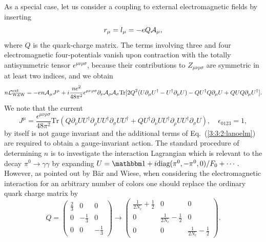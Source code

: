 \documentclass[twoside,12pt]{article}
\begin{document}
   As a special case, let us consider a coupling to external electromagnetic
fields by inserting
\begin{displaymath}
r_\mu=l_\mu=-e Q {\cal A}_\mu,
\end{displaymath}
where $Q$ is the quark-charge matrix.
   The terms involving three and four electromagnetic four-potentials
vanish upon contraction with the totally antisymmetric tensor
$\epsilon^{\mu\nu\rho\sigma}$, because their contributions to
$Z_{\mu\nu\rho\sigma}$ are symmetric in at least two indices, and
we obtain
\begin{equation}
\label{3:3:2:lanoelm}
n{\cal L}^{\rm ext}_{\rm WZW}=-e n {\cal A}_\mu J^\mu
+i \frac{n e^2 }{48\pi^2}\epsilon^{\mu\nu\rho\sigma}
\partial_\nu {\cal A}_\rho{\cal A}_\sigma
\mbox{Tr}[2Q^2(U\partial_\mu U^\dagger - U^\dagger \partial_\mu U)
- Q U^\dagger Q \partial_\mu U
+Q U Q \partial_\mu U^\dagger].
\end{equation}
   We note that the current
\begin{equation}
\label{3:3:2:jmu}
J^\mu=\frac{\epsilon^{\mu\nu\rho\sigma}}{48\pi^2}
\mbox{Tr}(Q\partial_\nu U U^\dagger \partial_\rho U U^\dagger
\partial_\sigma U U^\dagger
+Q U^\dagger \partial_\nu U U^\dagger \partial_\rho U U^\dagger
\partial_\sigma U),\quad \epsilon_{0123}=1,
\end{equation}
by itself is not gauge invariant and the additional terms of
Eq.\ (\ref{3:3:2:lanoelm}) are required to obtain a gauge-invariant action.
   The standard procedure of determining $n$ is to investigate
the interaction Lagrangian which is relevant to the decay
$\pi^0\to\gamma\gamma$ by expanding
$
U={\mathbbm 1}+i\mbox{diag}(\pi^0,-\pi^0,0)/F_0+\cdots.
$
   However, as pointed out by B\"ar and Wiese, when considering the electromagnetic
interaction for an arbitrary number of colors one should replace the ordinary
quark charge matrix by
\begin{displaymath}
Q=\left(
\begin{array}{rrr}
\frac{2}{3}&0&0\\
0&-\frac{1}{3}&0\\
0&0&-\frac{1}{3}
\end{array}
\right)
\to
\left(
\begin{array}{ccc}
\frac{1}{2N_c}+\frac{1}{2}&0&0\\
0&\frac{1}{2N_c}-\frac{1}{2}&0\\
0&0&\frac{1}{2N_c}-\frac{1}{2}
\end{array}
\right).
\end{displaymath}
\end{document}
